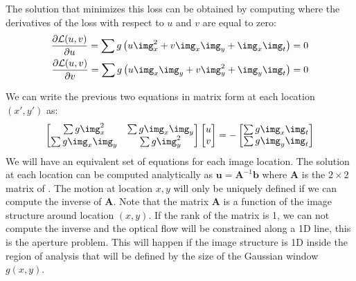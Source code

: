 The solution that minimizes this loss can be obtained by computing where the derivatives of the loss with respect to $u$ and $v$ are equal to zero: 
\begin{eqnarray}
\frac{\partial \mathcal{L}(u, v)}{\partial u } =
\sum g \left( u \img_x ^ 2 + v \img_x \img_y + \img_x \img_t  \right) = 0 \\
\frac{\partial \mathcal{L}(u, v)}{\partial v } = 
\sum g \left( u \img_x \img_y + v \img_y^2 + \img_y \img_t  \right) = 0
\end{eqnarray}

We can write the previous two equations in matrix form at each location $(x',y')$ as:
\begin{equation}
\begin{bmatrix}
\sum g \img_x ^ 2  & \sum g \img_x \img_y \\
\sum g \img_x \img_y & \sum g \img_y ^ 2 
\end{bmatrix}
\begin{bmatrix}
u \\
v
\end{bmatrix}
=
- 
\begin{bmatrix}
\sum g \img_x \img_t \\
\sum g \img_y \img_t
\end{bmatrix}
\label{eq:lk}
\end{equation}
We will have an equivalent set of equations for each image location. The solution at each location can be computed analytically as $\mathbf{u} = \mathbf{A}^{-1} \textbf{b}$ where $\mathbf{A}$ is the $2 \times 2$ matrix of \eqn{\ref{eq:lk}}. The motion at location $x,y$ will only be uniquely defined if we can compute the inverse of $\mathbf{A}$. Note that the matrix $\mathbf{A}$ is a function of the image structure around location $(x,y)$. If the rank of the matrix is 1, we can not compute the inverse and the optical flow will be constrained along a 1D line, this is the aperture problem. This will happen if the image structure is 1D inside the region of analysis that will be defined by the size of the Gaussian window $g(x,y)$.



